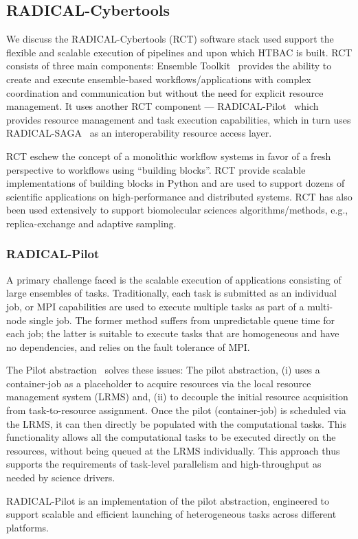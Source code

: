 \subsection{RADICAL-Cybertools}

We discuss the RADICAL-Cybertools (RCT) software stack used support the
flexible and scalable execution of pipelines and upon which HTBAC is built.
RCT consists of three main components: Ensemble Toolkit~\cite {entk-icpp-2016}
provides the ability to create and execute ensemble-based
workflows/applications with complex coordination and communication but without
the need for explicit resource management. It uses another RCT component ---
RADICAL-Pilot~\cite{review_radicalpilot} which provides resource management
and task execution capabilities, which in turn uses RADICAL-SAGA~\cite{saga-x
,ogf-gfd-90} as an interoperability resource access layer.

RCT eschew the concept of a monolithic workflow systems in favor of a fresh
perspective to workflows using ``building blocks''. RCT provide scalable
implementations of building blocks in Python and are used to support dozens of
scientific applications on high-performance and distributed systems. RCT has
also been used extensively to support biomolecular sciences
algorithms/methods, e.g., replica-exchange and adaptive sampling.

\subsubsection{RADICAL-Pilot}\label{sec:pilot}

A primary challenge faced is the scalable execution of applications consisting
of large ensembles of tasks.  Traditionally, each task is submitted as an
individual job, or MPI capabilities are used to  execute multiple tasks as
part of a multi-node single job. The former method suffers from unpredictable
queue time for each job; the latter is suitable to execute tasks that are
homogeneous and have no dependencies, and relies on the fault tolerance of
MPI.

The Pilot abstraction~\cite{review_pilotreview} solves these issues:  The
pilot abstraction, (i) uses a container-job as a placeholder to acquire
resources via the local resource management system (LRMS) and,  (ii) to
decouple the initial resource acquisition from task-to-resource assignment.
Once the pilot (container-job) is scheduled via the LRMS, it can then directly
be populated with the computational tasks. This functionality allows all the
computational tasks to be executed directly on the resources, without being
queued at the LRMS individually. This approach thus supports the requirements
of task-level parallelism and high-throughput as needed by science drivers.

RADICAL-Pilot is an implementation of the pilot abstraction, engineered to
support scalable and efficient launching of heterogeneous tasks across
different platforms.